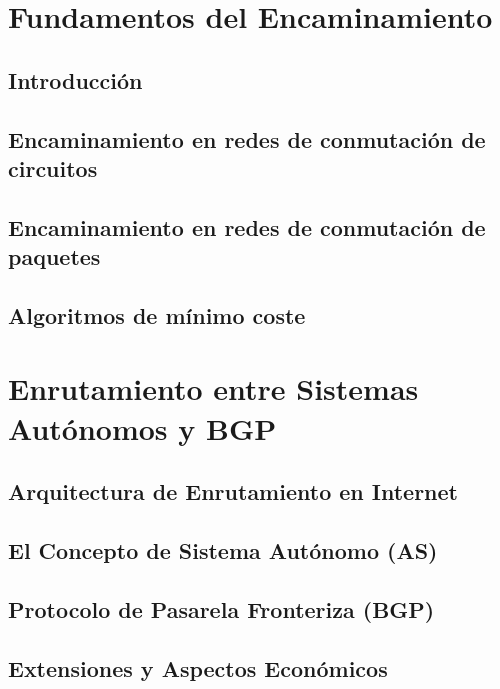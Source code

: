 \documentclass[12pts, a4paper]{book}
\begin{document}
	
	
	\tableofcontents
	
	\chapter{Fundamentos del Encaminamiento}	
		\section{Introducción}
		
		
		\section{Encaminamiento en redes de conmutación de circuitos}
		
		
		\section{Encaminamiento en redes de conmutación de paquetes}
		
		
		\section{Algoritmos de mínimo coste}
		
		
	\chapter{Enrutamiento entre Sistemas Autónomos y BGP}
		
		\section{Arquitectura de Enrutamiento en Internet}
		
		
		\section{El Concepto de Sistema Autónomo (AS)}
		
		
		\section{Protocolo de Pasarela Fronteriza (BGP)}
		
		
		\section{Extensiones y Aspectos Económicos}
		
		
\end{document}

